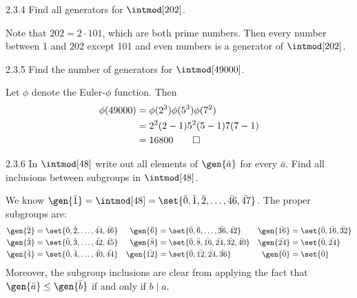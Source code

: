 \begin{exercise}{2.3.4}
    Find all generators for $\intmod[202]$.
\end{exercise}

\begin{sol}
    Note that $202 = 2 \cdot 101$, which are both prime numbers.
	Then every number between 1 and 202 except 101 and even numbers is a generator of $\intmod[202]$.
\end{sol}

\begin{exercise}{2.3.5}
    Find the number of generators for $\intmod[49000]$.
\end{exercise}

\begin{sol}
    Let $\phi$ denote the Euler-$\phi$ function.
	Then
    \begin{align*}
        \phi(49000) & = \phi(2^3)\phi(5^3)\phi(7^2) \\
        & = 2^2(2 - 1)5^2(5 - 1)7(7 - 1) \\
        & = 16800 \qedhere
    \end{align*}
\end{sol}

\begin{exercise}{2.3.6}
    In $\intmod[48]$ write out all elements of $\gen{\bar a}$ for every $\bar a$.
	Find all inclusions between subgroups in $\intmod[48]$.
\end{exercise}

\begin{sol}
    We know $\gen{\bar 1} = \intmod[48] = \set{\bar 0, \bar 1, \bar 2, \ldots, \bar{46}, \bar{47}}$.
	The proper subgroups are:
    \begin{align*}
        \gen{\bar 2} & = \set{\bar 0, \bar 2, \ldots, \bar{44}, \bar{46}} & \gen{\bar 6} & = \set{\bar 0, \bar 6, \ldots, \bar{36}, \bar{42}} & \gen{\bar{16}} & = \set{\bar 0, \bar{16}, \bar{32}} \\
        \gen{\bar 3} & = \set{\bar 0, \bar 3, \ldots, \bar{42}, \bar{45}} & \gen{\bar 8} & = \set{\bar 0, \bar 8, \bar{16}, \bar{24}, \bar{32}, \bar{40}} & \gen{\bar{24}} & = \set{\bar 0, \bar{24}} \\
        \gen{\bar 4} & = \set{\bar 0, \bar 4, \ldots, \bar{40}, \bar{44}} & \gen{\bar{12}} & = \set{\bar 0, \bar{12}, \bar{24}, \bar{36}} & \gen{\bar{0}} & = \set{\bar 0}
    \end{align*}
    Moreover, the subgroup inclusions are clear from applying the fact that $\gen{\bar a} \leq \gen{\bar b}$ if and only if $b \mid a$.
\end{sol}

